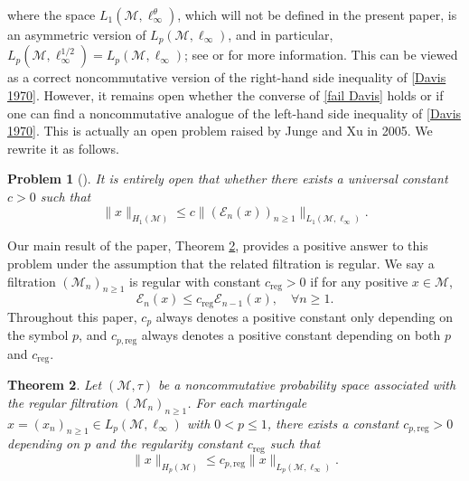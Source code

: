 \documentclass[11]{amsart}
\numberwithin{equation}{section}
\newtheorem{theorem}{Theorem}[section]
\newtheorem{problem}[theorem]{Problem}
\newcommand{\M}{\mathcal{M}}
\begin{document}
where the space $L_1(\M,\ell_{\infty}^{\theta})$, which will not be defined in the present paper, is an asymmetric version of $L_p(\M,\ell_{\infty})$, and in particular, $L_p(\M,\ell_{\infty}^{1/2})=L_p(\M,\ell_{\infty})$; see \cite[p.\,996]{HJP2016} or \cite[Section 3]{DJ2004} for more information.
This can be viewed as a correct noncommutative version of the right-hand side inequality of \eqref{Davis 1970}. 
However, it remains open whether the converse of \eqref{fail Davis} holds or if one can find a noncommutative analogue of the left-hand side inequality of \eqref{Davis 1970}.
This is actually an open problem raised by Junge and Xu in 2005. We rewrite it as follows.
\begin{problem}[{\cite[Problem 16]{JX2005}}]\label{JX problem} It is entirely open that whether there exists a universal constant $c>0$ such that 
	$$\|x\|_{H_1(\mathcal{M})}\leq c\|(\mathcal{E}_n(x))_{n\geq1}\|_{L_{1}(\mathcal{M},\ell_{\infty})}.$$
\end{problem}

Our  main result of the paper, Theorem \ref{Davis},  provides a positive answer to this problem under the assumption that the related filtration is regular. We say a filtration  $(\mathcal{M}_n)_{n\geq1}$ is regular with constant $c_{\mathrm{reg}}>0$ if for any positive $x\in \mathcal{M}$, 
\begin{equation}\label{regular}
	\mathcal{E}_n(x)\leq c_{\mathrm{reg}}\mathcal{E}_{n-1}(x),\quad \forall n\geq1.
\end{equation}
Throughout this paper, $c_p$ always denotes a positive constant only depending on the symbol $p$, and  $c_{p,\mathrm{reg}}$ always denotes a positive constant depending on both $p$ and $c_{\mathrm{reg}}$.

\begin{theorem}\label{Davis}
	Let $(\mathcal{M},\tau)$ be a noncommutative probability space associated with the regular filtration $(\mathcal{M}_n)_{n\geq1}$. For each martingale $x=(x_n)_{n\geq1}\in L_p(\mathcal{M}, \ell_{\infty})$ with $0<p\leq 1$, there exists a constant $c_{p,\mathrm{reg}}>0$ depending on $p$ and the regularity constant $c_{\mathrm{reg}}$ such that
	$$\|x\|_{H_p(\mathcal{M})}\leq c_{p,\mathrm{reg}}\|x\|_{L_p(\mathcal{M}, \ell_{\infty})}.$$
\end{theorem}
\end{document}
